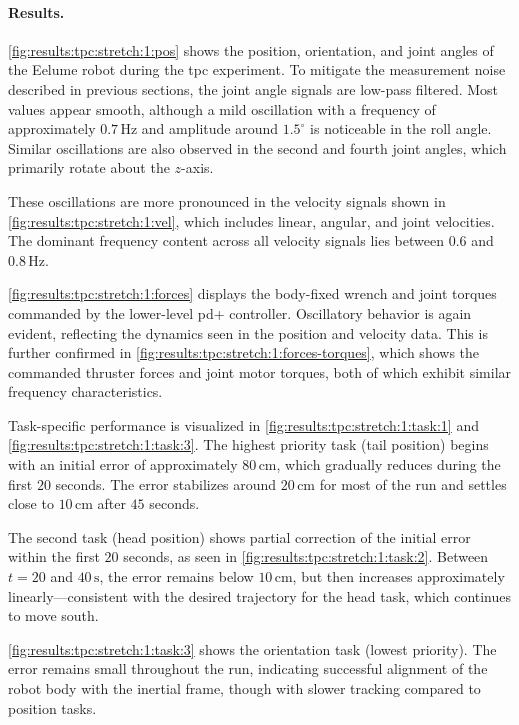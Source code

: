 \paragraph{Results.}

\autoref{fig:results:tpc:stretch:1:pos} shows the position, orientation, and joint angles of the Eelume robot during the \gls{tpc} experiment. To mitigate the measurement noise described in previous sections, the joint angle signals are low-pass filtered. Most values appear smooth, although a mild oscillation with a frequency of approximately \(0.7\,\mathrm{Hz}\) and amplitude around \(1.5^\circ\) is noticeable in the roll angle. Similar oscillations are also observed in the second and fourth joint angles, which primarily rotate about the \(z\)-axis.

These oscillations are more pronounced in the velocity signals shown in \autoref{fig:results:tpc:stretch:1:vel}, which includes linear, angular, and joint velocities. The dominant frequency content across all velocity signals lies between \(0.6\) and \(0.8\,\mathrm{Hz}\).

\autoref{fig:results:tpc:stretch:1:forces} displays the body-fixed wrench and joint torques commanded by the lower-level \gls{pd+} controller. Oscillatory behavior is again evident, reflecting the dynamics seen in the position and velocity data. This is further confirmed in \autoref{fig:results:tpc:stretch:1:forces-torques}, which shows the commanded thruster forces and joint motor torques, both of which exhibit similar frequency characteristics.

Task-specific performance is visualized in \autoref{fig:results:tpc:stretch:1:task:1} and \ref{fig:results:tpc:stretch:1:task:3}. The highest priority task (tail position) begins with an initial error of approximately \(80\,\mathrm{cm}\), which gradually reduces during the first \(20\) seconds. The error stabilizes around \(20\,\mathrm{cm}\) for most of the run and settles close to \(10\,\mathrm{cm}\) after \(45\) seconds.

The second task (head position) shows partial correction of the initial error within the first \(20\) seconds, as seen in \autoref{fig:results:tpc:stretch:1:task:2}. Between \(t = 20\) and \(40\,\mathrm{s}\), the error remains below \(10\,\mathrm{cm}\), but then increases approximately linearly—consistent with the desired trajectory for the head task, which continues to move south.

\autoref{fig:results:tpc:stretch:1:task:3} shows the orientation task (lowest priority). The error remains small throughout the run, indicating successful alignment of the robot body with the inertial frame, though with slower tracking compared to position tasks.

